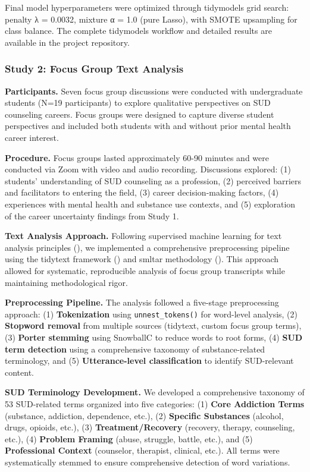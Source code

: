 \documentclass[
  man,
  longtable,
  nolmodern,
  notxfonts,
  notimes,
  colorlinks=true,linkcolor=blue,citecolor=blue,urlcolor=blue]{apa7}
\begin{document}
Final model hyperparameters were optimized through tidymodels grid
search: penalty λ = 0.0032, mixture α = 1.0 (pure Lasso), with SMOTE
upsampling for class balance. The complete tidymodels workflow and
detailed results are available in the project repository.

\subsubsection{Study 2: Focus Group Text
Analysis}\label{study-2-focus-group-text-analysis}

\textbf{Participants.} Seven focus group discussions were conducted with
undergraduate students (N=19 participants) to explore qualitative
perspectives on SUD counseling careers. Focus groups were designed to
capture diverse student perspectives and included both students with and
without prior mental health career interest.

\textbf{Procedure.} Focus groups lasted approximately 60-90 minutes and
were conducted via Zoom with video and audio recording. Discussions
explored: (1) students' understanding of SUD counseling as a profession,
(2) perceived barriers and facilitators to entering the field, (3)
career decision-making factors, (4) experiences with mental health and
substance use contexts, and (5) exploration of the career uncertainty
findings from Study 1.

\textbf{Text Analysis Approach.} Following supervised machine learning
for text analysis principles (), we implemented a comprehensive preprocessing pipeline
using the tidytext framework () and smltar methodology
(). This approach
allowed for systematic, reproducible analysis of focus group transcripts
while maintaining methodological rigor.

\textbf{Preprocessing Pipeline.} The analysis followed a five-stage
preprocessing approach: (1) \textbf{Tokenization} using
\texttt{unnest\_tokens()} for word-level analysis, (2) \textbf{Stopword
removal} from multiple sources (tidytext, custom focus group terms), (3)
\textbf{Porter stemming} using SnowballC to reduce words to root forms,
(4) \textbf{SUD term detection} using a comprehensive taxonomy of
substance-related terminology, and (5) \textbf{Utterance-level
classification} to identify SUD-relevant content.

\textbf{SUD Terminology Development.} We developed a comprehensive
taxonomy of 53 SUD-related terms organized into five categories: (1)
\textbf{Core Addiction Terms} (substance, addiction, dependence, etc.),
(2) \textbf{Specific Substances} (alcohol, drugs, opioids, etc.), (3)
\textbf{Treatment/Recovery} (recovery, therapy, counseling, etc.), (4)
\textbf{Problem Framing} (abuse, struggle, battle, etc.), and (5)
\textbf{Professional Context} (counselor, therapist, clinical, etc.).
All terms were systematically stemmed to ensure comprehensive detection
of word variations.
\end{document}
